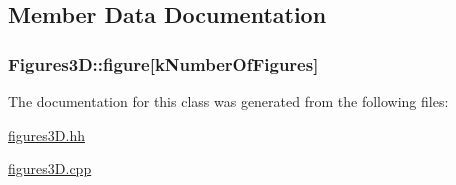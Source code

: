 \subsection{Member Data Documentation}
\subsubsection[{\texorpdfstring{figure}{figure}}]{ Figures3\+D\+::figure\mbox{[}{\bf k\+Number\+Of\+Figures}\mbox{]}\hspace{0.3cm}{\ttfamily [private]}}\hypertarget{class_figures3_d_a76d206fdb62bc6c64b4b1d4a6ce1d458}{}\label{class_figures3_d_a76d206fdb62bc6c64b4b1d4a6ce1d458}


The documentation for this class was generated from the following files\+:\begin{DoxyCompactItemize}
\item 
\hyperlink{figures3_d_8hh}{figures3\+D.\+hh}\item 
\hyperlink{figures3_d_8cpp}{figures3\+D.\+cpp}\end{DoxyCompactItemize}
